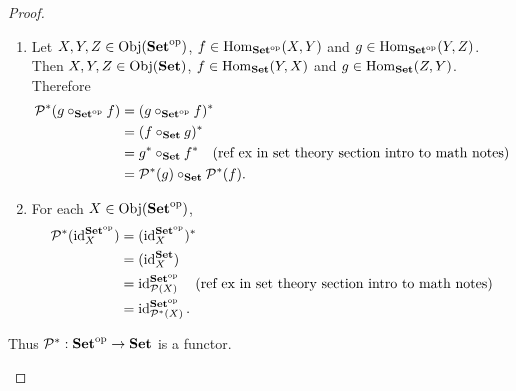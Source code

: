 \documentclass{book}
\begin{document}
\begin{proof}
\begin{enumerate}
\begin{enumerate}
			\item 
			Let $X,Y,Z \in \Obj(\op{\bSet})$, $f \in \Hom_{\op{\bSet}}(X,Y)$ and $g \in \Hom_{\op{\bSet}}(Y,Z)$. Then $X,Y,Z \in \Obj(\bSet)$, $f \in \Hom_{\bSet}(Y,X)$ and $g \in \Hom_{\bSet}(Z,Y)$. Therefore
			\begin{align*}
				\MP^*(g \circ_{\op{\bSet}} f)
				& = (g \circ_{\op{\bSet}} f)^* \\
				& = (f \circ_{\bSet} g)^* \\
				& = g^* \circ_{\bSet} f^* \quad \text{(ref ex in set theory section intro to math notes)} \\
				& = \MP^*(g) \circ_{\bSet} \MP^*(f).
			\end{align*}
			\item 
			For each $X \in \Obj(\op{\bSet})$, 
			\begin{align*}
				\MP^*(\id_X^{\op{\bSet}})
				& = (\id_X^{\op{\bSet}})^* \\
				& = (\id_X^{\bSet}) \\
				& = \id_{\MP(X)}^{\op{\bSet}} \quad \text{(ref ex in set theory section intro to math notes)} \\
				& = \id_{\MP^*(X)}^{\op{\bSet}}.
			\end{align*}
		\end{enumerate}
		Thus $\MP^*: \op{\bSet} \rightarrow \bSet$ is a functor.
	\end{enumerate}
\end{proof}
\end{document}
